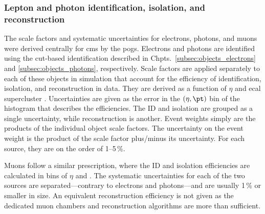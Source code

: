 

\subsubsection{Lepton and photon identification, isolation, and reconstruction}
\label{subsubsec:htoinv_lepton_id_iso_reco_systs}

The scale factors and systematic uncertainties for electrons, photons, and muons were derived centrally for \acrshort{cms} by the \acrlong{pog}s. Electrons and photons are identified using the cut-based identification described in Chpts.~\ref{subsec:objects_electrons} and \ref{subsec:objects_photons}, respectively. Scale factors are applied separately to each of these objects in simulation that account for the efficiency of identification, isolation, and reconstruction in data. They are derived as a function of $\eta$ and \acrshort{ecal} supercluster \pt. Uncertainties are given as the error in the $(\eta, \pt)$ bin of the histogram that describes the efficiencies. The ID and isolation are grouped as a single uncertainty, while reconstruction is another. Event weights simply are the products of the individual object scale factors. The uncertainty on the event weight is the product of the scale factor plus/minus its uncertainty. For each source, they are on the order of 1--5\,\%.



Muons follow a similar prescription, where the ID and isolation efficiencies are calculated in bins of $\eta$ and \pt. The systematic uncertainties for each of the two sources are separated---contrary to electrons and photons---and are usually 1\,\% or smaller in size. An equivalent reconstruction efficiency is not given as the dedicated muon chambers and reconstruction algorithms are more than sufficient.



